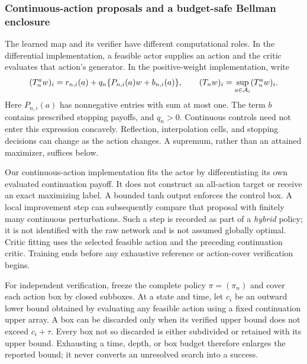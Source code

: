 \subsubsection{Continuous-action proposals and a budget-safe Bellman enclosure}\label{sec:r8-operator}
The learned map and its verifier have different computational roles. In the differential implementation, a feasible actor supplies an action and the critic evaluates that action's generator. In the positive-weight implementation, write
\begin{equation}\label{eq:r8-positive}
 (T_n^a w)_i=r_{n,i}(a)+q_n\{P_{n,i}(a)w+b_{n,i}(a)\},
 \qquad (T_nw)_i=\sup_{a\in\mathcal A_i}(T_n^aw)_i .
\end{equation}
Here $P_{n,i}(a)$ has nonnegative entries with sum at most one. The term $b$ contains prescribed stopping payoffs, and $q_n>0$. Continuous controls need not enter this expression concavely. Reflection, interpolation cells, and stopping decisions can change as the action changes. A supremum, rather than an attained maximizer, suffices below.

Our continuous-action implementation fits the actor by differentiating its own evaluated continuation payoff. It does not construct an all-action target or receive an exact maximizing label. A bounded tanh output enforces the control box. A local improvement step can subsequently compare that proposal with finitely many continuous perturbations. Such a step is recorded as part of a \emph{hybrid} policy; it is not identified with the raw network and is not assumed globally optimal. Critic fitting uses the selected feasible action and the preceding continuation critic. Training ends before any exhaustive reference or action-cover verification begins.

For independent verification, freeze the complete policy $\pi=(\pi_n)$ and cover each action box by closed subboxes. At a state and time, let $c_i$ be an outward lower bound obtained by evaluating any feasible action using a fixed continuation upper array. A box can be discarded only when its verified upper bound does not exceed $c_i+\tau$. Every box not so discarded is either subdivided or retained with its upper bound. Exhausting a time, depth, or box budget therefore enlarges the reported bound; it never converts an unresolved search into a success.

